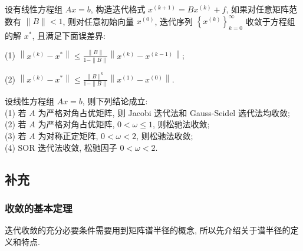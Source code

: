 设有线性方程组 $ A x=b $, 构造迭代格式 $ x^{(k+1)}=B x^{(k)}+f $, 如果对任意矩阵范数有 $ \|B\|<1 $, 则对任意初始向量 $ x^{(0)} $, 迭代序列 $ \left\{x^{(k)}\right\}_{k=0}^{\infty} $ 收敛于方程组的解 $ x^{*} $, 且满足下面误差界:

(1) $\displaystyle \left\|x^{(k)}-x^{*}\right\| \leqslant \frac{\|B\|}{1-\|B\|}\left\|x^{(k)}-x^{(k-1)}\right\| $;

(2) $\displaystyle \left\|x^{(k)}-x^{*}\right\| \leqslant \frac{\|B\|^{k}}{1-\|B\|}\left\|x^{(1)}-x^{(0)}\right\| $.

设线性方程组 $ A x=b $, 则下列结论成立:\\
(1) 若 $ A $ 为严格对角占优矩阵, 则 Jacobi 迭代法和 Gauss-Seidel 选代法均收敛;\\
(2) 若 $ A $ 为严格对角占优矩阵, $ 0<\omega \leqslant 1 $, 则松驰法收敛;\\
(3) 若 $ A $ 为对称正定矩阵, $ 0<\omega<2 $, 则松驰法收敛;\\
(4) SOR 迭代法收敛, 松驰因子 $ 0<\omega<2 $.


\subsection{补充}
\subsubsection{收敛的基本定理}

迭代收敛的充分必要条件需要用到矩阵谱半径的概念, 所以先介绍关于谱半径的定义和特点.

